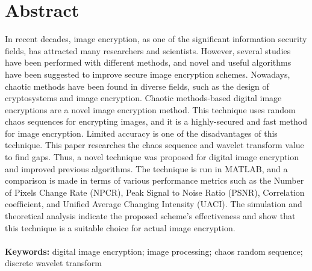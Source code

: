 \chapter{Abstract}

    In recent decades, image encryption, as one of the significant information security fields, 
    has attracted many researchers and scientists. However, 
    several studies have been performed with different methods, 
    and novel and useful algorithms have been suggested to improve secure image 
    encryption schemes. Nowadays, chaotic methods have been found in diverse fields, 
    such as the design of cryptosystems and image encryption. 
    Chaotic methods-based digital image encryptions are a novel image encryption method. 
    This technique uses random chaos sequences for encrypting images, 
    and it is a highly-secured and fast method for image encryption. 
    Limited accuracy is one of the disadvantages of this technique. 
    This paper researches the chaos sequence and wavelet transform value to find gaps. 
    Thus, a novel technique was proposed for digital image encryption and improved previous algorithms. 
    The technique is run in MATLAB, and a comparison is made in terms of various performance 
    metrics such as the Number of Pixels Change Rate (NPCR), Peak Signal to Noise Ratio (PSNR), 
    Correlation coefficient, and Unified Average Changing Intensity (UACI). 
    The simulation and theoretical analysis indicate the proposed scheme's effectiveness and show 
    that this technique is a suitable choice for actual image encryption.\\
    \\
    {\bfseries Keywords:} digital image encryption; image processing; chaos random sequence; discrete wavelet transform

